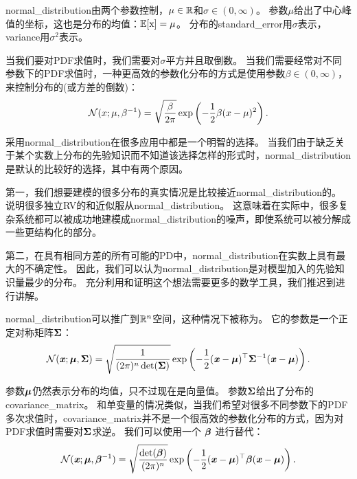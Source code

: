 \gls{normal_distribution}由两个参数控制，$\mu \in \mathbb{R}$和$\sigma \in (0, \infty)$。
参数$\mu$给出了中心峰值的坐标，这也是分布的均值：$\mathbb{E}[\mathrm{x}] = \mu$。
分布的\gls{standard_error}用$\sigma$表示，\gls{variance}用$\sigma^2$表示。

当我们要对\gls{PDF}求值时，我们需要对$\sigma$平方并且取倒数。
当我们需要经常对不同参数下的\gls{PDF}求值时，一种更高效的参数化分布的方式是使用参数$\beta \in (0, \infty)$，来控制分布的(或方差的倒数)：
\begin{equation}
\mathcal{N}(x; \mu, \beta^{-1}) = \sqrt{\frac{\beta}{2\pi}} \exp \left(  -\frac{1}{2}\beta (x-\mu)^2 \right).
\label{eq:3.22}
\end{equation}

采用\gls{normal_distribution}在很多应用中都是一个明智的选择。
当我们由于缺乏关于某个实数上分布的先验知识而不知道该选择怎样的形式时，\gls{normal_distribution}是默认的比较好的选择，其中有两个原因。


第一，我们想要建模的很多分布的真实情况是比较接近\gls{normal_distribution}的。
说明很多独立\gls{RV}的和近似服从\gls{normal_distribution}。
这意味着在实际中，很多复杂系统都可以被成功地建模成\gls{normal_distribution}的噪声，即使系统可以被分解成一些更结构化的部分。

第二，在具有相同方差的所有可能的\gls{PD}中，\gls{normal_distribution}在实数上具有最大的不确定性。
因此，我们可以认为\gls{normal_distribution}是对模型加入的先验知识量最少的分布。
充分利用和证明这个想法需要更多的数学工具，我们推迟到进行讲解。

\gls{normal_distribution}可以推广到$\mathbb{R}^n$空间，这种情况下被称为。
它的参数是一个正定对称矩阵$\boldsymbol{\Sigma}$：
\begin{equation}
\label{eq:3.23}
\mathcal{N}(\boldsymbol{\mathit{x}}; \boldsymbol{\mu}, \boldsymbol{\Sigma}) = \sqrt{ \frac{1}{ (2\pi)^n \det(\boldsymbol{\Sigma})}}  \exp \left ( -\frac{1}{2} (\boldsymbol{\mathit{x}}-\boldsymbol{\mu})^\top \boldsymbol{\Sigma}^{-1} (\boldsymbol{\mathit{x}}- \boldsymbol{\mu}) \right).
\end{equation}

参数$\boldsymbol{\mu}$仍然表示分布的均值，只不过现在是向量值。
参数$\boldsymbol{\Sigma}$给出了分布的\gls{covariance_matrix}。
和单变量的情况类似，当我们希望对很多不同参数下的\gls{PDF}多次求值时，\gls{covariance_matrix}并不是一个很高效的参数化分布的方式，因为对\gls{PDF}求值时需要对$\boldsymbol{\Sigma}$求逆。
我们可以使用一个 $\boldsymbol{\beta}$ 进行替代：
\begin{equation}
\mathcal{N}(\boldsymbol{\mathit{x}}; \boldsymbol{\mu}, \boldsymbol{\beta}^{-1}) = \sqrt{ \frac{\det(\boldsymbol{\beta})}{ (2\pi)^n}}  \exp \left ( -\frac{1}{2} (\boldsymbol{\mathit{x}}-\boldsymbol{\mu})^\top \boldsymbol{\beta} (\boldsymbol{\mathit{x}}- \boldsymbol{\mu}) \right).
\end{equation}


